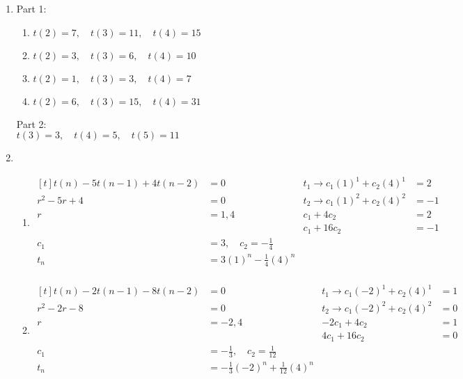 \begin{enumerate}[leftmargin=2cm,labelsep=.5cm,label=\bf\arabic*.]
\item Part 1:
\begin{enumerate}
\item $t(2) = 7, \quad t(3) = 11, \quad t(4) = 15$
\item $t(2) = 3, \quad t(3) = 6,  \quad t(4) = 10$
\item $t(2) = 1, \quad t(3) = 3,  \quad t(4) = 7$
\item $t(2) = 6, \quad t(3) = 15, \quad t(4) = 31$\\[2mm]
\end{enumerate}
Part 2:\\
$t(3) = 3, \quad t(4) = 5, \quad t(5) = 11$\\[5mm]

\item
\begin{enumerate}
\item $
\begin{aligned}[t]
t(n) - 5t(n-1) + 4t(n-2) &= 0 & t_1 \rightarrow c_1(1)^1 + c_2(4)^1 &= 2 \\
r^2 - 5r + 4 &= 0             & t_2 \rightarrow c_1(1)^2 + c_2(4)^2 &= -1 \\
r &= 1, 4                     & c_1 + 4c_2 &= 2 \\
&                             & c_1 + 16c_2 &= -1 \\[2mm]
c_1 &= 3, \quad c_2 = -\frac{1}{4}  & & \\
t_n &= 3(1)^n -\frac{1}{4}(4)^n \\[2mm]
\end{aligned} $


\item $
\begin{aligned}[t]
t(n) - 2t(n-1) - 8t(n-2) &= 0 & t_1 \rightarrow c_1(-2)^1 + c_2(4)^1 &= 1 \\
r^2 - 2r - 8 &= 0             & t_2 \rightarrow c_1(-2)^2 + c_2(4)^2 &= 0 \\
r &= -2, 4                    & -2c_1 + 4c_2 &= 1 \\
&                             & 4c_1 + 16c_2 &= 0 \\[2mm]
c_1 &= -\frac{1}{3}, \quad c_2 = \frac{1}{12}  & & \\
t_n &= -\frac{1}{3}(-2)^n + \frac{1}{12}(4)^n \\[2mm]
\end{aligned} $


\end{enumerate}
\end{enumerate}
